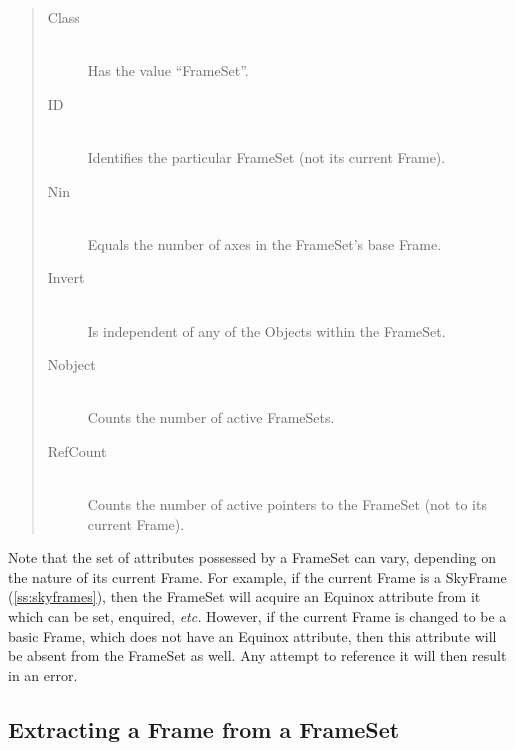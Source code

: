 \documentclass[twoside,11pt]{article}
\newenvironment{latexonly}{}{}
\newcommand{\htmlref}[2]{#1}
\newcommand{\secref}[1]{\S\ref{#1}}
\renewcommand{\secref}[1]{\ref{#1}}
\begin{document}
\begin{quote}
\begin{description}
\item[\htmlref{Class}{Class}]\begin{latexonly}\mbox{}\\ \end{latexonly}
Has the value ``FrameSet''.
\item[\htmlref{ID}{ID}]\begin{latexonly}\mbox{}\\ \end{latexonly}
Identifies the particular FrameSet (not its current Frame).
\item[\htmlref{Nin}{Nin}]\begin{latexonly}\mbox{}\\ \end{latexonly}
Equals the number of axes in the FrameSet's base Frame.
\item[\htmlref{Invert}{Invert}]\begin{latexonly}\mbox{}\\ \end{latexonly}
Is independent of any of the Objects within the FrameSet.
\item[\htmlref{Nobject}{Nobject}]\begin{latexonly}\mbox{}\\ \end{latexonly}
Counts the number of active FrameSets.
\item[\htmlref{RefCount}{RefCount}]\begin{latexonly}\mbox{}\\ \end{latexonly}
Counts the number of active pointers to the FrameSet (not to its
current Frame).
\end{description}
\end{quote}

Note that the set of attributes possessed by a FrameSet can vary,
depending on the nature of its current Frame. For example, if the
current Frame is a \htmlref{SkyFrame}{SkyFrame} (\secref{ss:skyframes}), then the FrameSet
will acquire an \htmlref{Equinox}{Equinox} attribute from it which can be set, enquired,
{\em{etc.}}  However, if the current Frame is changed to be a basic
Frame, which does not have an Equinox attribute, then this attribute
will be absent from the FrameSet as well. Any attempt to reference it
will then result in an error.

\subsection{Extracting a Frame from a FrameSet}
\end{document}
